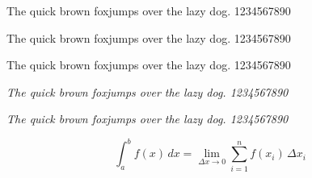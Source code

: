 \documentclass{article}
\newcommand{\pangram}[1]{{#1 The quick brown foxjumps over the lazy dog. 1234567890\par}}
\begin{document}
\large

\pangram{\rmfamily}
\pangram{\sffamily}
\pangram{\ttfamily}
\pangram{\itshape}
\pangram{\slshape}

\[
    \int_a^b \! f(x) \, dx = \lim_{\Delta x \rightarrow 0}
    \sum_{i=1}^{n} f(x_i) \,\Delta x_i
\]
\end{document}
